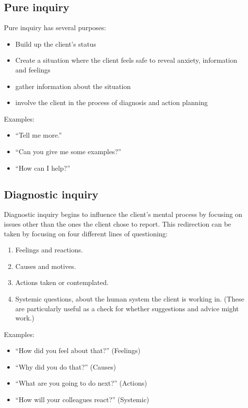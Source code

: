 \documentclass{article}
\newenvironment{nosepitemize}
{ \begin{itemize}
    \setlength{\itemsep}{0pt}
    \setlength{\parskip}{0pt}
    \setlength{\parsep}{0pt}     }
{ \end{itemize}                  }
\newenvironment{nosepenumerate}
{ \begin{enumerate}
    \setlength{\itemsep}{0pt}
    \setlength{\parskip}{0pt}
    \setlength{\parsep}{0pt}     }
{ \end{enumerate}                  }
\begin{document}
\begin{multicols}{2}

\subsection{Pure inquiry}

Pure inquiry has several purposes:
\begin{nosepitemize}
    \item Build up the client's status
    \item Create a situation where the client feels safe to reveal anxiety, information and feelings
    \item gather information about the situation
    \item involve the client in the process of diagnosis and action planning
\end{nosepitemize}

\noindent
Examples:
\begin{nosepitemize}
    \item ``Tell me more.''
    \item ``Can you give me some examples?''
    \item ``How can I help?''
\end{nosepitemize}

\subsection{Diagnostic inquiry}

Diagnostic inquiry begins to influence the client's mental process by focusing on issues other than the ones the client chose to report. This redirection can be taken by focusing on four different lines of questioning:
\begin{nosepenumerate}
    \item Feelings and reactions.
    \item Causes and motives.
    \item Actions taken or contemplated.
    \item Systemic questions, about the human system the client is working in. (These are particularly useful as a check for whether suggestions and advice might work.)
\end{nosepenumerate}

\noindent
Examples:
\begin{nosepitemize}
    \item ``How did you feel about that?'' (Feelings)
    \item ``Why did you do that?'' (Causes)
    \item ``What are you going to do next?'' (Actions)
    \item ``How will your colleagues react?'' (Systemic)
\end{nosepitemize}


\end{multicols}
\end{document}
